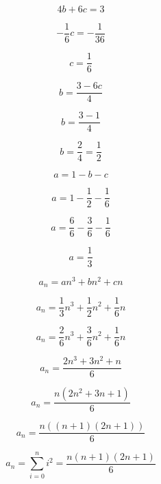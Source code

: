 \[
4b + 6c = 3
\]

\[
-\frac{1}{6} c = -\frac{1}{36}
\]

\[
c = \frac{1}{6}
\]

\[
b = \frac{3 - 6c}{4}
\]

\[
b = \frac{3 - 1}{4}
\]

\[
b = \frac{2}{4} = \frac{1}{2}
\]

\[
a = 1 - b - c
\]

\[
a = 1 - \frac{1}{2} - \frac{1}{6}
\]

\[
a = \frac{6}{6} - \frac{3}{6} - \frac{1}{6}
\]

\[
a = \frac{1}{3}
\]

\[
a_n = a n^3 + b n^2 + c n
\]

\[
a_n = \frac{1}{3} n^3 + \frac{1}{2} n^2 + \frac{1}{6} n
\]

\[
a_n = \frac{2}{6} n^3 + \frac{3}{6} n^2 + \frac{1}{6} n
\]

\[
a_n = \frac{2n^3 + 3n^2 + n}{6}
\]

\[
a_n = \frac{n(2n^2 + 3n + 1)}{6}
\]

\[
a_n = \frac{n \left( (n+1)(2n+1) \right)}{6}
\]

\[
a_n = \sum_{i=0}^{n} i^2 = \frac{n(n+1)(2n+1)}{6}
\]

